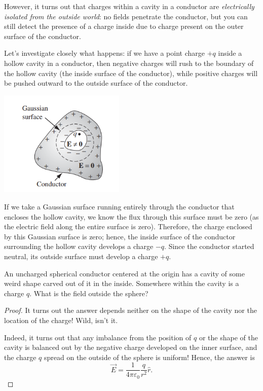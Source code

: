 However, it turns out that charges within a cavity in a conductor are \textit{electrically isolated from the outside world}: no fields penetrate the conductor, but you can still detect the presence of a charge inside due to charge present on the outer surface of the conductor.

Let's investigate closely what happens: if we have a point charge $+q$ inside a hollow cavity in a conductor, then negative charges will rush to the boundary of the hollow cavity (the inside surface of the conductor), while positive charges will be pushed outward to the outside surface of the conductor. 

\begin{center}
    \includegraphics[width=6cm]{Electrodynamics/images/fig2.45.PNG}
\end{center}

If we take a Gaussian surface running entirely through the conductor that encloses the hollow cavity, we know the flux through this surface must be zero (as the electric field along the entire surface is zero). Therefore, the charge enclosed by this Gaussian surface is zero; hence, the inside surface of the conductor surrounding the hollow cavity develops a charge $-q$. Since the conductor started neutral, its outside surface must develop a charge $+q$. 

\begin{example}
An uncharged spherical conductor centered at the origin has a cavity of some weird shape carved out of it in the inside. Somewhere within the cavity is a charge $q$. What is the field outside the sphere?
\end{example}

\begin{proof}
    It turns out the answer depends neither on the shape of the cavity nor the location of the charge! Wild, isn't it. 
    
    Indeed, it turns out that any imbalance from the position of $q$ or the shape of the cavity is balanced out by the negative charge developed on the inner surface, and the charge $q$ spread on the outside of the sphere is uniform! Hence, the answer is
    \[\boxed{\vec{E}=\frac{1}{4\pi\varepsilon_0}\frac{q}{r^2}\hat{r}}.\]
\end{proof}

